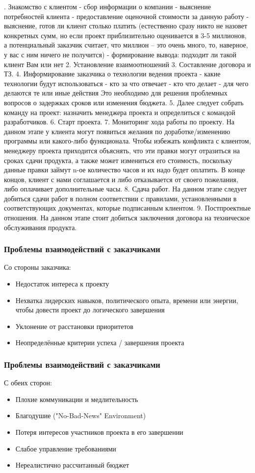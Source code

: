 \documentclass{../industrial-development}
\begin{document}
. Знакомство с клиентом
  - сбор информации о компании
  -  выяснение потребностей клиента
  - предоставление оценочной стоимости за данную работу
 -  выяснение, готов ли клиент столько платить (естественно сразу никто не назовет конкретных сумм, но если проект приблизительно оценивается в 3-5 миллионов, а потенциальный заказчик считает, что миллион –  это очень много, то, наверное, у вас с ним ничего не получится)
  - формирование вывода: подходит ли такой клиент Вам или нет
2. Установление взаимоотношений
3. Составление договора и ТЗ.
4. Информирование заказчика о технологии ведения проекта
 - какие технологии будут использоваться
 - кто за что отвечает
 - кто что делает
 - для чего делаются те или иные действия
 Это необходимо для решения проблемных вопросов о задержках сроков или изменения бюджета.
5. Далее следует собрать команду на проект: назначить менеджера проекта и определиться с командой разработчиков.
6. Старт проекта.
7. Мониторинг хода работы по проекту. 
На данном этапе у клиента могут появиться желания по доработке/изменению программы или какого-либо функционала. Чтобы избежать конфликта с клиентом, менеджеру проекта приходится объяснять, что эти правки могут отразиться на сроках сдачи продукта, а также может измениться его стоимость, поскольку данные правки займут n-ое количество часов и их надо будет оплатить. В конце концов, клиент с нами соглашается и либо отказывается от своего пожелания, либо оплачивает дополнительные часы. 
8. Сдача работ.
На данном этапе следует добиться сдачи работ в полном соответствии с правилами, установленными в соответствующих документах, которые подписанным клиентом.
9. Постпроектные отношения. 
На данном этапе стоит добиться заключения договора на техническое обслуживания продукта.

\begin{frame} \frametitle{Проблемы взаимодействий с заказчиками}
	Со стороны заказчика:
	\begin{itemize}
		\item Недостаток интереса к проекту
		\item Нехватка лидерских навыков, политического опыта, времени или энергии, чтобы довести проект до логического завершения
		\item Уклонение от расстановки приоритетов
		\item Неопределённые критерии успеха / завершения проекта
	\end{itemize}
\end{frame}

\begin{frame} \frametitle{Проблемы взаимодействий с заказчиками}
	С обеих сторон:
	\begin{itemize}
		\item Плохие коммуникации и медлительность
		\item Благодушие ("No-Bad-News" Environment)
		\item Потеря интересов участников проекта в его завершении
		\item Слабое управление требованиями
		\item Нереалистично рассчитанный бюджет
	\end{itemize}
\end{frame}
\end{document}
